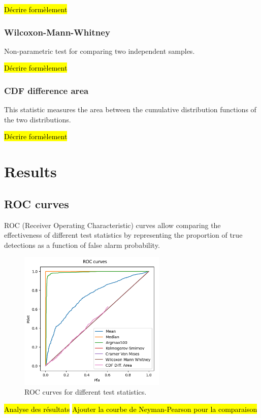 \documentclass{article}
\begin{document}
\hl{Décrire formèlement}

\subsubsection{Wilcoxon-Mann-Whitney}
Non-parametric test for comparing two independent samples.

\hl{Décrire formèlement}

\subsubsection{CDF difference area}
This statistic measures the area between the cumulative distribution functions of the two distributions.

\hl{Décrire formèlement}


\section{Results}

\subsection{ROC curves}

ROC (Receiver Operating Characteristic) curves allow comparing the effectiveness of different test statistics by representing the proportion of true detections as a function of false alarm probability.

\begin{figure}[H]
\centering
\includegraphics[width=7cm]{img/roc_curves.png}
\caption{ROC curves for different test statistics.}
\label{fig:roc}
\end{figure}

\hl{Analyse des résultats}
\hl{Ajouter la courbe de Neyman-Pearson pour la comparaison}
\end{document}
